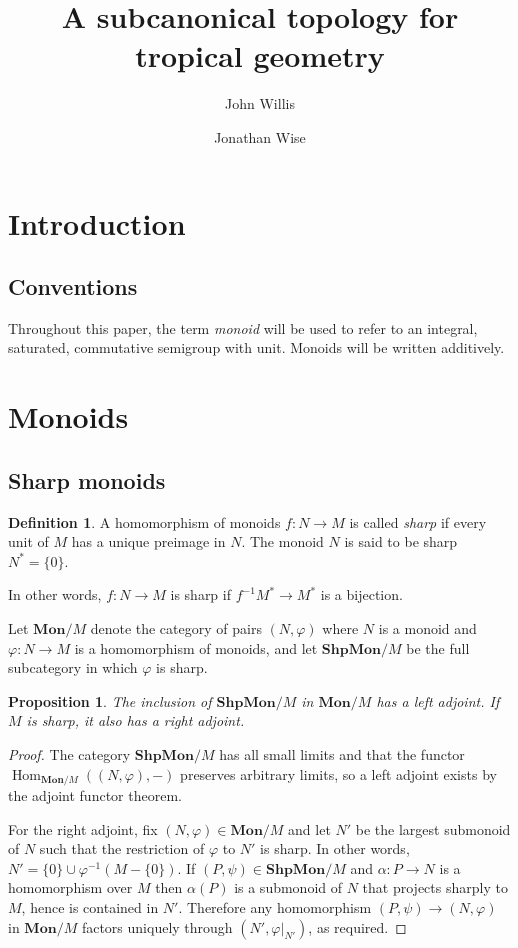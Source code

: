 \documentclass[12pt]{amsart}
\author{John Willis}
\author{Jonathan Wise}
\title{A subcanonical topology for tropical geometry}
\theoremstyle{plan}
\newtheorem{proposition}[theorem]{Proposition}
\numberwithin{lemma}{theorem}
\numberwithin{corollary}{theorem}
\theoremstyle{definition}
\newtheorem{definition}[theorem]{Definition}
\theoremstyle{remark}
\def\Mon{\mathbf{Mon}}
\def\ShpMon{\mathbf{ShpMon}}
\def\Hom{\operatorname{Hom}}
\begin{document}
\maketitle

\section{Introduction}

\subsection{Conventions}

Throughout this paper, the term \emph{monoid} will be used to refer to an integral, saturated, commutative semigroup with unit.  Monoids will be written additively.

\section{Monoids}


\subsection{Sharp monoids}

\begin{definition}
A homomorphism of monoids $f : N \to M$ is called \emph{sharp} if every unit of $M$ has a unique preimage in $N$.   The monoid $N$ is said to be sharp $N^\ast = \{ 0 \}$.
\end{definition}

In other words, $f : N \to M$ is sharp if $f^{-1} M^\ast \to M^\ast$ is a bijection.

Let $\Mon / M$ denote the category of pairs $(N, \varphi)$ where $N$ is a monoid and $\varphi : N \to M$ is a homomorphism of monoids, and let $\ShpMon / M$ be the full subcategory in which $\varphi$ is sharp.  

\begin{proposition}
The inclusion of $\ShpMon / M$ in $\Mon / M$ has a left adjoint.  If $M$ is sharp, it also has a right adjoint.
\end{proposition}
\begin{proof}
The category $\ShpMon / M$ has all small limits and that the functor $\Hom_{\Mon/M}((N,\varphi), -)$ preserves arbitrary limits, so a left adjoint exists by the adjoint functor theorem.

For the right adjoint, fix $(N,\varphi) \in \Mon / M$ and let $N'$ be the largest submonoid of $N$ such that the restriction of $\varphi$ to $N'$ is sharp.  In other words, $N' = \{ 0 \} \cup \varphi^{-1}(M - \{ 0 \})$.  If $(P,\psi) \in \ShpMon / M$ and $\alpha : P \to N$ is a homomorphism over $M$ then $\alpha(P)$ is a submonoid of $N$ that projects sharply to $M$, hence is contained in $N'$.  Therefore any homomorphism $(P,\psi) \to (N,\varphi)$ in $\Mon/M$ factors uniquely through $(N',\varphi \big|_{N'})$, as required.
\end{proof}
\end{document}
